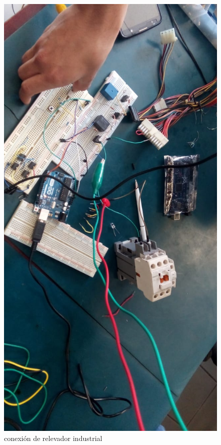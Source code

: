\documentclass[11pt,a4paper]{article}
\begin{document}
\begin{figure}[h]
\begin{center}
\includegraphics[scale=0.15]{3.jpeg}
\caption{conexión de relevador industrial}
\end{center}
\end{figure}
\end{document}
